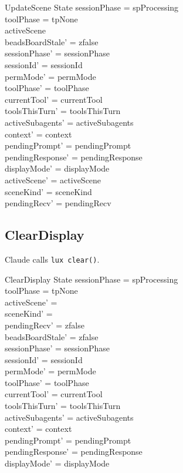 \documentclass[a4paper,10pt,fleqn]{article}
\begin{document}
\begin{schema}{UpdateScene}
  \Delta State
  \where
  sessionPhase = spProcessing \\
  toolPhase = tpNone \\
  activeScene \neq \emptyset \\
  beadsBoardStale' = zfalse \\
  sessionPhase' = sessionPhase \\
  sessionId' = sessionId \\
  permMode' = permMode \\
  toolPhase' = toolPhase \\
  currentTool' = currentTool \\
  toolsThisTurn' = toolsThisTurn \\
  activeSubagents' = activeSubagents \\
  context' = context \\
  pendingPrompt' = pendingPrompt \\
  pendingResponse' = pendingResponse \\
  displayMode' = displayMode \\
  activeScene' = activeScene \\
  sceneKind' = sceneKind \\
  pendingRecv' = pendingRecv
\end{schema}

\subsection{ClearDisplay}

Claude calls \texttt{lux clear()}.

\begin{schema}{ClearDisplay}
  \Delta State
  \where
  sessionPhase = spProcessing \\
  toolPhase = tpNone \\
  activeScene' = \emptyset \\
  sceneKind' = \emptyset \\
  pendingRecv' = zfalse \\
  beadsBoardStale' = zfalse \\
  sessionPhase' = sessionPhase \\
  sessionId' = sessionId \\
  permMode' = permMode \\
  toolPhase' = toolPhase \\
  currentTool' = currentTool \\
  toolsThisTurn' = toolsThisTurn \\
  activeSubagents' = activeSubagents \\
  context' = context \\
  pendingPrompt' = pendingPrompt \\
  pendingResponse' = pendingResponse \\
  displayMode' = displayMode
\end{schema}
\end{document}
